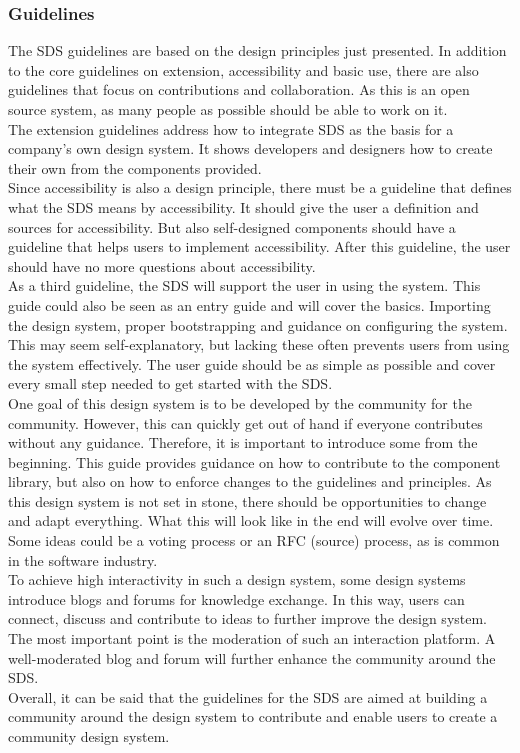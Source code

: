 \subsubsection*{Guidelines}
The SDS guidelines are based on the design principles just presented. In addition to the core guidelines on extension, accessibility and basic use, there are also guidelines that focus on contributions and collaboration. As this is an open source system, as many people as possible should be able to work on it. \\
The extension guidelines address how to integrate SDS as the basis for a company's own design system. It shows developers and designers how to create their own from the components provided. \\
Since accessibility is also a design principle, there must be a guideline that defines what the SDS means by accessibility. It should give the user a definition and sources for accessibility. But also self-designed components should have a guideline that helps users to implement accessibility. After this guideline, the user should have no more questions about accessibility. \\
As a third guideline, the SDS will support the user in using the system. This guide could also be seen as an entry guide and will cover the basics. Importing the design system, proper bootstrapping and guidance on configuring the system. This may seem self-explanatory, but lacking these often prevents users from using the system effectively. The user guide should be as simple as possible and cover every small step needed to get started with the SDS. \\
One goal of this design system is to be developed by the community for the community. However, this can quickly get out of hand if everyone contributes without any guidance. Therefore, it is important to introduce some from the beginning. This guide provides guidance on how to contribute to the component library, but also on how to enforce changes to the guidelines and principles. As this design system is not set in stone, there should be opportunities to change and adapt everything. What this will look like in the end will evolve over time. Some ideas could be a voting process or an RFC (source) process, as is common in the software industry. \\
To achieve high interactivity in such a design system, some design systems introduce blogs and forums for knowledge exchange. In this way, users can connect, discuss and contribute to ideas to further improve the design system. The most important point is the moderation of such an interaction platform. A well-moderated blog and forum will further enhance the community around the SDS. \\
Overall, it can be said that the guidelines for the SDS are aimed at building a community around the design system to contribute and enable users to create a community design system. \\
